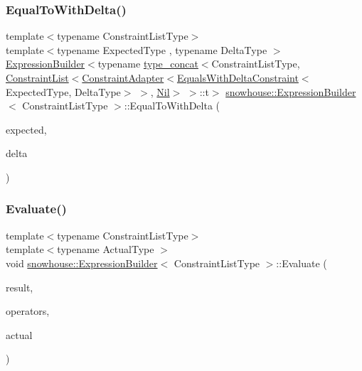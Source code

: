 \subsubsection{\texorpdfstring{EqualToWithDelta()}{EqualToWithDelta()}}
{\footnotesize\ttfamily template$<$typename Constraint\+List\+Type$>$ \\
template$<$typename Expected\+Type , typename Delta\+Type $>$ \\
\mbox{\hyperlink{structsnowhouse_1_1ExpressionBuilder}{Expression\+Builder}}$<$typename \mbox{\hyperlink{structsnowhouse_1_1type__concat}{type\+\_\+concat}}$<$Constraint\+List\+Type, \mbox{\hyperlink{structsnowhouse_1_1ConstraintList}{Constraint\+List}}$<$\mbox{\hyperlink{structsnowhouse_1_1ConstraintAdapter}{Constraint\+Adapter}}$<$\mbox{\hyperlink{structsnowhouse_1_1EqualsWithDeltaConstraint}{Equals\+With\+Delta\+Constraint}}$<$Expected\+Type, Delta\+Type$>$ $>$, \mbox{\hyperlink{structsnowhouse_1_1Nil}{Nil}}$>$ $>$\+::t$>$ \mbox{\hyperlink{structsnowhouse_1_1ExpressionBuilder}{snowhouse\+::\+Expression\+Builder}}$<$ Constraint\+List\+Type $>$\+::Equal\+To\+With\+Delta (\begin{DoxyParamCaption}\item[{const Expected\+Type \&}]{expected,  }\item[{const Delta\+Type \&}]{delta }\end{DoxyParamCaption})\hspace{0.3cm}{\ttfamily [inline]}}

\mbox{\label{structsnowhouse_1_1ExpressionBuilder_a9485df17c1551ede162d861629429eb4}} 
\subsubsection{\texorpdfstring{Evaluate()}{Evaluate()}}
{\footnotesize\ttfamily template$<$typename Constraint\+List\+Type$>$ \\
template$<$typename Actual\+Type $>$ \\
void \mbox{\hyperlink{structsnowhouse_1_1ExpressionBuilder}{snowhouse\+::\+Expression\+Builder}}$<$ Constraint\+List\+Type $>$\+::Evaluate (\begin{DoxyParamCaption}\item[{\mbox{\hyperlink{namespacesnowhouse_a719169b1315a13161c15f25e600a8f51}{Result\+Stack}} \&}]{result,  }\item[{\mbox{\hyperlink{namespacesnowhouse_adcb10e215e6a4bbcb35722a9c7270fc6}{Operator\+Stack}} \&}]{operators,  }\item[{const Actual\+Type \&}]{actual }\end{DoxyParamCaption})\hspace{0.3cm}{\ttfamily [inline]}}


